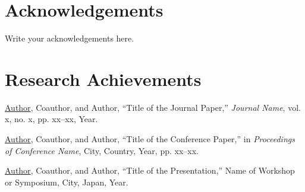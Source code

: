 \documentclass[10pt,a4paper,xelatex,ja=minimal,nomag]{bxjsreport}
\newif\ifusebibliography
\newcommand{\achievementauthor}[1]{\underline{#1}}
\begin{document}
\maketitle
{}

\begin{abstract}
Write your abstract here.

\end{abstract}

\tableofcontents

\clearpage
{}



{}
\section*{Acknowledgements}
Write your acknowledgements here.

\clearpage

\ifusebibliography
    \phantomsection
    \addcontentsline{toc}{chapter}{\bibname}
    \nocite{*}
    
    
\fi

\clearpage
{}
{}
\section*{Research Achievements}

\begin{achievementlist}
    \item \achievementauthor{Author}, Coauthor, and Author, ``Title of the Journal Paper,'' \textit{Journal Name}, vol. x, no. x, pp. xx--xx, Year.
    \item \achievementauthor{Author}, Coauthor, and Author, ``Title of the Conference Paper,'' in \textit{Proceedings of Conference Name}, City, Country, Year, pp. xx--xx.
    \item \achievementauthor{Author}, Coauthor, and Author, ``Title of the Presentation,'' Name of Workshop or Symposium, City, Japan, Year.
\end{achievementlist}

\end{document}
